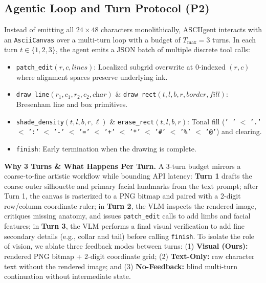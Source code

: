 \documentclass[10pt,twocolumn]{article}
\begin{document}
\subsection{Agentic Loop and Turn Protocol (P2)}
Instead of emitting all $24 \times 48$ characters monolithically, ASCIIgent interacts with an \texttt{AsciiCanvas} over a multi-turn loop with a budget of $T_{\max} = 3$ turns. In each turn $t \in \{1, 2, 3\}$, the agent emits a JSON batch of multiple discrete tool calls:
\begin{itemize}
  \item \texttt{patch\_edit}$(r, c, \textit{lines})$: Localized subgrid overwrite at 0-indexed $(r, c)$ where alignment spaces preserve underlying ink.
  \item \texttt{draw\_line}$(r_1, c_1, r_2, c_2, \textit{char})$ \& \texttt{draw\_rect}$(t, l, b, r, \textit{border}, \textit{fill})$: Bresenham line and box primitives.
  \item \texttt{shade\_density}$(t, l, b, r, \ell)$ \& \texttt{erase\_rect}$(t, l, b, r)$: Tonal fill (\texttt{' '} $<$ \texttt{'.'} $<$ \texttt{':'} $<$ \texttt{'-'} $<$ \texttt{'='} $<$ \texttt{'+'} $<$ \texttt{'*'} $<$ \texttt{'\#'} $<$ \texttt{'\%'} $<$ \texttt{'@'}) and clearing.
  \item \texttt{finish}: Early termination when the drawing is complete.
\end{itemize}

\textbf{Why 3 Turns \& What Happens Per Turn.}
A 3-turn budget mirrors a coarse-to-fine artistic workflow while bounding API latency: \textbf{Turn 1} drafts the coarse outer silhouette and primary facial landmarks from the text prompt; after Turn 1, the canvas is rasterized to a PNG bitmap and paired with a 2-digit row/column coordinate ruler; in \textbf{Turn 2}, the VLM inspects the rendered image, critiques missing anatomy, and issues \texttt{patch\_edit} calls to add limbs and facial features; in \textbf{Turn 3}, the VLM performs a final visual verification to add fine secondary details (e.g., collar and tail) before calling \texttt{finish}. To isolate the role of vision, we ablate three feedback modes between turns: (1) \textbf{Visual (Ours):} rendered PNG bitmap + 2-digit coordinate grid; (2) \textbf{Text-Only:} raw character text without the rendered image; and (3) \textbf{No-Feedback:} blind multi-turn continuation without intermediate state.
\end{document}
